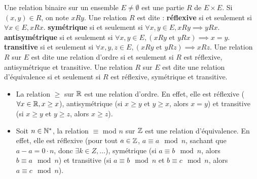 \documentclass[12pt, a4paper]{report}
\begin{document}
\begin{definition}
    \begin{outline}
        \1 Une relation binaire sur un ensemble $E\not= \emptyset$ est une partie $R$ de $E \times E$. Si $(x,y) \in R$, on note $xRy$.
        \1 Une relation $R$ est dite :
        \2 \textbf{réflexive} si et seulement si $\forall x \in E, xRx$.
        \2 \textbf{symétrique} si et seulement si $\forall x,y \in E, xRy \implies yRx$.
        \2 \textbf{antisymétrique} si et seulement si $\forall x,y \in E, (xRy \text{ et } yRx) \implies x=y$.
        \2 \textbf{transitive} si et seulement si $\forall x,y,z \in E, (xRy \text{ et } yRz) \implies xRz$.
        \1 Une relation $R$ sur $E$ est dite une relation d'ordre si et seulement si $R$ est réflexive, antisymétrique et transitive.
        \1 Une relation $R$ sur $E$ est dite une relation d'équivalence si et seulement si $R$ est réflexive, symétrique et transitive.
    \end{outline}
\end{definition}

\begin{example}
    \begin{itemize}
        \item La relation $\ge$ sur $\mathbb{R}$ est une relation d'ordre. En effet, elle est réflexive ($\forall x \in \mathbb{R}, x \ge x$), antisymétrique (si $x \ge y$ et $y \ge x$, alors $x=y$) et transitive (si $x \ge y$ et $y \ge z$, alors $x \ge z$).
        \item Soit $n\in\mathbb{N}^*$, la relation $\equiv$ mod $n$ sur $\mathbb{Z}$ est une relation d'équivalence. En effet, elle est réflexive (pour tout $a\in\mathbb{Z}$, $a \equiv a \mod n$, sachant que $a-a=0\cdot n$, donc $\exists k \in Z, \dots$), symétrique (si $a \equiv b \mod n$, alors $b \equiv a \mod n$) et transitive (si $a \equiv b \mod n$ et $b \equiv c \mod n$, alors $a \equiv c \mod n$).
    \end{itemize}
\end{example}
\end{document}
